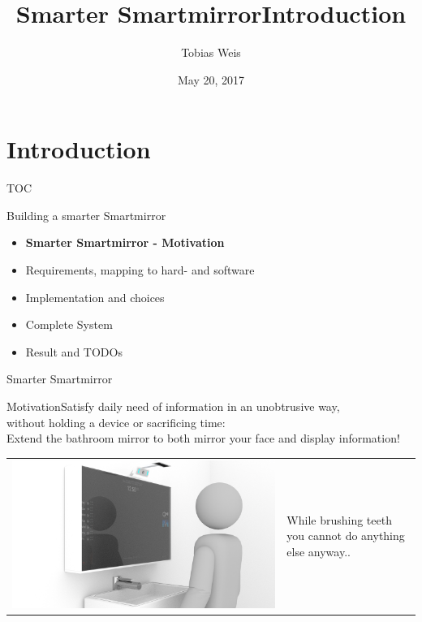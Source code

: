 \documentclass[xcolor=svgnames,handout,aspectratio=169]{beamer}
\title
  [Short Title\hspace{2em}]
  {Smarter Smartmirror}
\author
  [Tobias Weis]
  {Tobias Weis}
\date
  {May 20, 2017}
\institute
  {Systems Engineering}
\begin{document}
\maketitle

\section{Introduction}
\title[Intro]{Introduction}

\begin{frame}
  {TOC}

  Building a smarter Smartmirror

  \begin{itemize}
  \item \textbf{Smarter Smartmirror - Motivation}
  \item Requirements, mapping to hard- and software
  \item Implementation and choices
  \item Complete System
  \item Result and TODOs  
  \end{itemize}
\end{frame}

\begin{frame}
	{Smarter Smartmirror}

    \begin{block}{Motivation}Satisfy daily need of information in an unobtrusive way,\\
    	 without holding a device or sacrificing time:\\
		 Extend the bathroom mirror to both mirror your face and display information!
	\end{block}
	
		\begin{tabular}{cl}  
			\parbox{0.6\linewidth}{
				\includegraphics[width=\linewidth]{images/mirror_complete}
				}
		&
			\parbox{0.3\linewidth}{
		    	While brushing teeth you cannot do anything else anyway..
		    	}
		  \end{tabular}
\end{frame}
\end{document}
